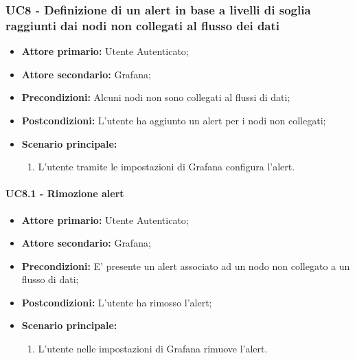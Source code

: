 \pagebreak

\subsubsection{UC8 - Definizione di un alert in base a livelli di soglia raggiunti dai nodi non collegati al flusso dei dati}\label{UC8}
\begin{itemize}
	\item \textbf{Attore primario:} Utente Autenticato;
	\item \textbf{Attore secondario:} Grafana;
	\item \textbf{Precondizioni:} Alcuni nodi non sono collegati al flussi di dati;
	\item \textbf{Postcondizioni:} L'utente ha aggiunto un alert per i nodi non collegati;
	\item \textbf{Scenario principale:}
	\begin{enumerate}
		\item L'utente tramite le impostazioni di Grafana configura l'alert.
	\end{enumerate}
\end{itemize}

\paragraph{UC8.1 - Rimozione alert}\label{UC8.1}
\begin{itemize}
	\item \textbf{Attore primario:} Utente Autenticato;
	\item \textbf{Attore secondario:} Grafana;
	\item \textbf{Precondizioni:} E' presente un alert associato ad un nodo non collegato a un flusso di dati;
	\item \textbf{Postcondizioni:} L'utente ha rimosso l'alert;
	\item \textbf{Scenario principale:}
	\begin{enumerate}
		\item L'utente nelle impostazioni di Grafana rimuove l'alert.
	\end{enumerate}
\end{itemize}
